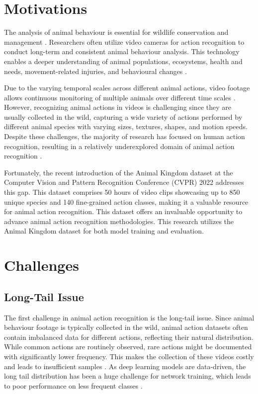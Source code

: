 \section{Motivations}
The analysis of animal behaviour is essential for wildlife conservation and management \parencite{Greggor2019, singh2020animal}. Researchers often utilize video cameras for action recognition to conduct long-term and consistent animal behaviour analysis. This technology enables a deeper understanding of animal populations, ecosystems, health and needs, movement-related injuries, and behavioural changes \parencite{ng2022animal, Giersberg:2022aa, 8259762}.

Due to the varying temporal scales across different animal actions, video footage allows continuous monitoring of multiple animals over different time scales \parencite{ANDERSON201418}. However, recognizing animal actions in videos is challenging since they are usually collected in the wild, capturing a wide variety of actions performed by different animal species with varying sizes, textures, shapes, and motion speeds. Despite these challenges, the majority of research has focused on human action recognition, resulting in a relatively underexplored domain of animal action recognition \parencite{mondal2023msqnet}.

Fortunately, the recent introduction of the Animal Kingdom dataset \parencite{ng2022animal} at the Computer Vision and Pattern Recognition Conference (CVPR) 2022 addresses this gap. This dataset comprises 50 hours of video clips showcasing up to 850 unique species and 140 fine-grained action classes, making it a valuable resource for animal action recognition. This dataset offers an invaluable opportunity to advance animal action recognition methodologies. This research utilizes the Animal Kingdom dataset for both model training and evaluation.

\section{Challenges}
\subsection{Long-Tail Issue}
The first challenge in animal action recognition is the long-tail issue. Since animal behaviour footage is typically collected in the wild, animal action datasets often contain imbalanced data for different actions, reflecting their natural distribution. While common actions are routinely observed, rare actions might be documented with significantly lower frequency. This makes the collection of these videos costly and leads to insufficient samples \parencite{ng2022animal, perrett2023use}. As deep learning models are data-driven, the long tail distribution has been a huge challenge for network training, which leads to poor performance on less frequent classes \parencite{cao2019learning, zhang2021videolt}.

